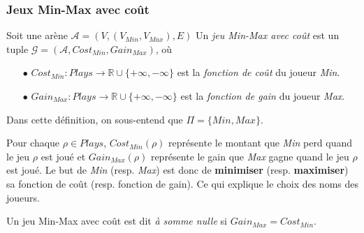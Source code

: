 
\subsubsection{Jeux Min-Max avec coût}


\begin{defi} $\text{ }$\\
	Soit une arène $\mathcal{A} = (V, (V_{Min}, V_{Max}), E) $
	Un \textit{jeu Min-Max avec coût} est un tuple $\mathcal{G} = (\mathcal{A}, Cost_{Min}, Gain_{Max})$, où
	\begin{enumerate}
		\item[$\bullet$] $Cost_{Min}: Plays \rightarrow \mathbb{R} \cup \{+ \infty, -\infty \}$ est la \textit{fonction de coût} du joueur \textit{Min}.
		\item[$\bullet$] $Gain_{Max}: Plays \rightarrow \mathbb{R} \cup \{ + \infty, -\infty \}$ est la \textit{fonction de gain} du joueur \textit{Max}.
	\end{enumerate}
		
\end{defi}

\begin{rem}
	Dans cette définition, on sous-entend que $\Pi = \{ Min, Max \}$.
\end{rem}

Pour chaque $\rho \in Plays$, $Cost_{Min}(\rho)$ représente le montant que \textit{Min} perd quand le jeu $\rho$ est joué et $Gain_{Max}(\rho)$ représente le gain que \textit{Max} gagne quand le jeu $\rho$ est joué.
Le but de \textit{Min} (resp. \textit{Max}) est donc de \textbf{minimiser} (resp. \textbf{maximiser}) sa fonction de coût (resp. fonction de gain). Ce qui explique le choix des noms des joueurs.\\


\begin{defi}
	Un jeu Min-Max avec coût est dit \textit{à somme nulle} si $Gain_{Max} = Cost_{Min}$.
\end{defi}


